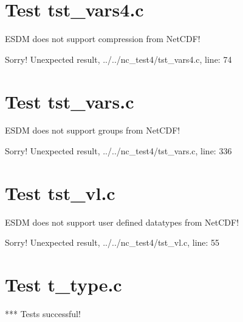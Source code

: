 \section{Test tst\_vars4.c}

ESDM does not support compression from NetCDF!

Sorry! Unexpected result, ../../nc\_test4/tst\_vars4.c, line: 74

\section{Test tst\_vars.c}

ESDM does not support groups from NetCDF!

Sorry! Unexpected result, ../../nc\_test4/tst\_vars.c, line: 336

\section{Test tst\_vl.c}

ESDM does not support user defined datatypes from NetCDF!

Sorry! Unexpected result, ../../nc\_test4/tst\_vl.c, line: 55

\section{Test t\_type.c}

*** Tests successful!

\clearpage

